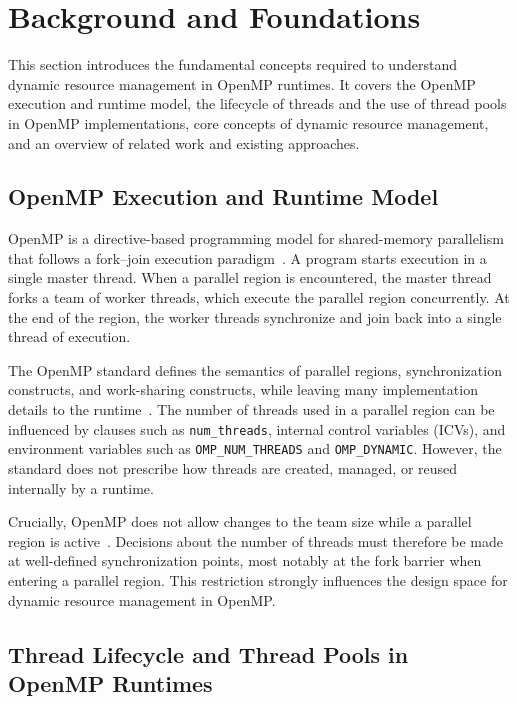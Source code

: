 
\chapter{Background and Foundations}\label{chapter:background}

This section introduces the fundamental concepts required to understand dynamic resource management in OpenMP runtimes. It covers the OpenMP execution and runtime model, the lifecycle of threads and the use of thread pools in OpenMP implementations, core concepts of dynamic resource management, and an overview of related work and existing approaches.

\section{OpenMP Execution and Runtime Model}

OpenMP is a directive-based programming model for shared-memory parallelism that follows a fork--join execution paradigm~\parencite{dagum_openmp_1998}. A program starts execution in a single master thread. When a parallel region is encountered, the master thread forks a team of worker threads, which execute the parallel region concurrently. At the end of the region, the worker threads synchronize and join back into a single thread of execution.

The OpenMP standard defines the semantics of parallel regions, synchronization constructs, and work-sharing constructs, while leaving many implementation details to the runtime~\parencite{openmp60}. The number of threads used in a parallel region can be influenced by clauses such as \texttt{num\_threads}, internal control variables (ICVs), and environment variables such as \texttt{OMP\_NUM\_THREADS} and \texttt{OMP\_DYNAMIC}. However, the standard does not prescribe how threads are created, managed, or reused internally by a runtime.

Crucially, OpenMP does not allow changes to the team size while a parallel region is active~\parencite{openmp60}. Decisions about the number of threads must therefore be made at well-defined synchronization points, most notably at the fork barrier when entering a parallel region. This restriction strongly influences the design space for dynamic resource management in OpenMP.

\section{Thread Lifecycle and Thread Pools in OpenMP Runtimes}

